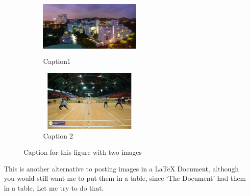 \documentclass[12pt, a4paper]{article}
\begin{document}
\begin{figure}[h]
\begin{subfigure}[h]{0.5\textwidth}
\centering
\includegraphics[width=5cm, height=3cm]{img1} 
\caption{Caption1}
\label{fig:subim1}
\end{subfigure}
\begin{subfigure}[h]{0.5\textwidth}
\centering
\includegraphics[width=5cm, height=3cm]{img2}
\caption{Caption 2}
\label{fig:subim2}
\end{subfigure}
\caption{Caption for this figure with two images}
\label{fig:image2}
\end{figure}

This is another alternative to posting images in a \LaTeX{} Document, although you would still want me to put them in a table, since ‘The Document’ had them in a table. Let me try to do that.
\end{document}
